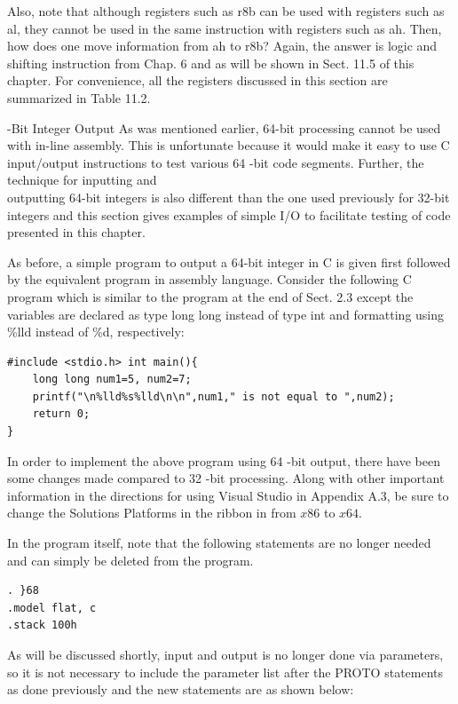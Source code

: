 \documentclass[10pt]{book}
\begin{document}
Also, note that although registers such as r8b can be used with registers such as al, they cannot be used in the same instruction with registers such as ah. Then, how does one move information from ah to r8b? Again, the answer is logic and shifting instruction from Chap. 6 and as will be shown in Sect. 11.5 of this chapter. For convenience, all the registers discussed in this section are summarized in Table 11.2.

-Bit Integer Output
As was mentioned earlier, 64-bit processing cannot be used with in-line assembly. This is unfortunate because it would make it easy to use C input/output instructions to test various 64 -bit code segments. Further, the technique for inputting and\\
outputting 64-bit integers is also different than the one used previously for 32-bit integers and this section gives examples of simple I/O to facilitate testing of code presented in this chapter.

As before, a simple program to output a 64-bit integer in C is given first followed by the equivalent program in assembly language. Consider the following C program which is similar to the program at the end of Sect. 2.3 except the variables are declared as type long long instead of type int and formatting using \%lld instead of \%d, respectively:

\begin{verbatim}
#include <stdio.h> int main(){
    long long num1=5, num2=7;
    printf("\n%lld%s%lld\n\n",num1," is not equal to ",num2);
    return 0;
}
\end{verbatim}

In order to implement the above program using 64 -bit output, there have been some changes made compared to 32 -bit processing. Along with other important information in the directions for using Visual Studio in Appendix A.3, be sure to change the Solutions Platforms in the ribbon in from $x 86$ to $x 64$.

In the program itself, note that the following statements are no longer needed and can simply be deleted from the program.

\begin{verbatim}
. }68
.model flat, c
.stack 100h
\end{verbatim}

As will be discussed shortly, input and output is no longer done via parameters, so it is not necessary to include the parameter list after the PROTO statements as done previously and the new statements are as shown below:
\end{document}
